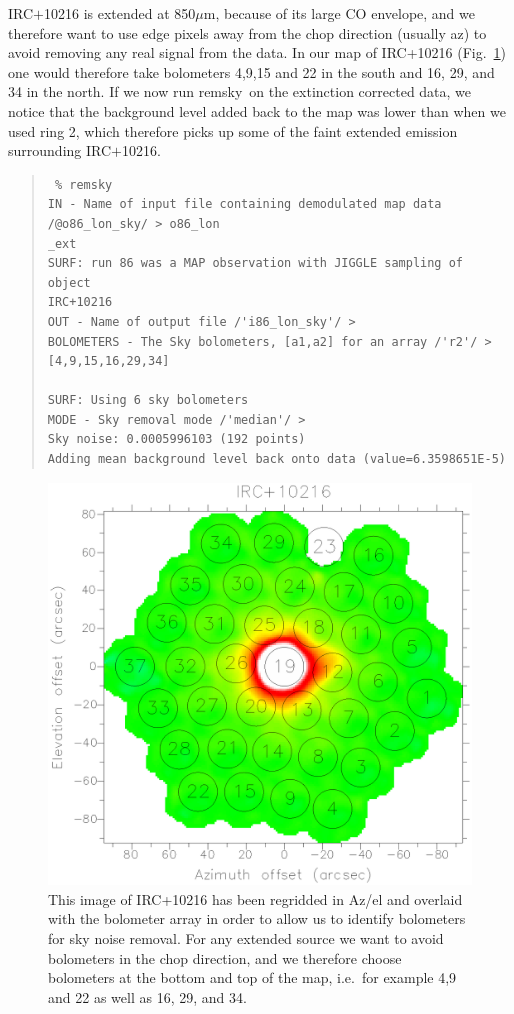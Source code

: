 \documentclass[twoside,11pt]{article}
\newenvironment{myquote}{\begin{quote}\begin{small}}{\end{small}\end{quote}}
\newcommand{\task}[1]{\textsf{#1}}
\newcommand{\remsky}{\xref{\task{remsky}}{sun216}{REMSKY}}
\newcommand{\xref}[3]{#1}
\renewcommand{\_}{\texttt{\symbol{95}}}
\begin{document}
IRC$+$10216 is extended at 850$\mu$m, because of its large CO
envelope, and we therefore want to use edge pixels away from the chop
direction (usually az) to avoid removing any real signal from the
data.  In our map of IRC+10216 (Fig.\ \ref{fig:irc}) one would
therefore take bolometers 4,9,15 and 22 in the south and 16, 29, and
34 in the north.  If we now run \remsky\ on the extinction corrected
data, we notice that the background level added back to the map was
lower than when we used ring 2, which therefore picks up some of the
faint extended emission surrounding IRC$+$10216.


\begin{myquote}
\begin{verbatim}
 % remsky
IN - Name of input file containing demodulated map data
/@o86_lon_sky/ > o86_lon
_ext
SURF: run 86 was a MAP observation with JIGGLE sampling of object
IRC+10216
OUT - Name of output file /'i86_lon_sky'/ >
BOLOMETERS - The Sky bolometers, [a1,a2] for an array /'r2'/ >
[4,9,15,16,29,34]

SURF: Using 6 sky bolometers
MODE - Sky removal mode /'median'/ >
Sky noise: 0.0005996103 (192 points)
Adding mean background level back onto data (value=6.3598651E-5)
\end{verbatim}
\end{myquote}


\begin{figure}
\begin{center}
\includegraphics[width=\textwidth]{sc11_fig4.eps}
\caption{This image of IRC+10216 has been regridded in Az/el and
overlaid with the bolometer array in order to allow us to identify
bolometers for sky noise removal. For any extended source we want to
avoid bolometers in the chop direction, and we therefore choose
bolometers at the bottom and top of the map, i.e.\ for example 4,9 and
22 as well as 16, 29, and 34.}
\label{fig:irc}
\end{center}
\end{figure}
\end{document}
